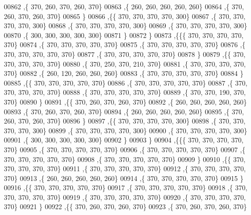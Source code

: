 \begin{DoxyCode}
00862    ,\{   370,   260,   370,   260,   370\}
00863    ,\{   260,   260,   260,   260,   260\}
00864    ,\{   370,   260,   370,   260,   370\}
00865    \}
00866   ,\{\{   370,   370,   370,   370,   300\}
00867    ,\{   370,   370,   370,   370,   300\}
00868    ,\{   370,   370,   370,   370,   300\}
00869    ,\{   370,   370,   370,   370,   300\}
00870    ,\{   300,   300,   300,   300,   300\}
00871    \}
00872   \}
00873  ,\{\{\{   370,   370,   370,   370,   370\}
00874    ,\{   370,   370,   370,   370,   370\}
00875    ,\{   370,   370,   370,   370,   370\}
00876    ,\{   370,   370,   370,   370,   370\}
00877    ,\{   370,   370,   370,   370,   370\}
00878    \}
00879   ,\{\{   370,   370,   370,   370,   370\}
00880    ,\{   370,   250,   370,   210,   370\}
00881    ,\{   370,   370,   370,   370,   370\}
00882    ,\{   260,   120,   260,   260,   260\}
00883    ,\{   370,   370,   370,   370,   370\}
00884    \}
00885   ,\{\{   370,   370,   370,   370,   370\}
00886    ,\{   370,   370,   370,   370,   370\}
00887    ,\{   370,   370,   370,   370,   370\}
00888    ,\{   370,   370,   370,   370,   370\}
00889    ,\{   370,   370,   190,   370,   370\}
00890    \}
00891   ,\{\{   370,   260,   370,   260,   370\}
00892    ,\{   260,   260,   260,   260,   260\}
00893    ,\{   370,   260,   370,   260,   370\}
00894    ,\{   260,   260,   260,   260,   260\}
00895    ,\{   370,   260,   370,   260,   370\}
00896    \}
00897   ,\{\{   370,   370,   370,   370,   300\}
00898    ,\{   370,   370,   370,   370,   300\}
00899    ,\{   370,   370,   370,   370,   300\}
00900    ,\{   370,   370,   370,   370,   300\}
00901    ,\{   300,   300,   300,   300,   300\}
00902    \}
00903   \}
00904  ,\{\{\{   370,   370,   370,   370,   370\}
00905    ,\{   370,   370,   370,   370,   370\}
00906    ,\{   370,   370,   370,   370,   370\}
00907    ,\{   370,   370,   370,   370,   370\}
00908    ,\{   370,   370,   370,   370,   370\}
00909    \}
00910   ,\{\{   370,   370,   370,   370,   370\}
00911    ,\{   370,   370,   370,   370,   370\}
00912    ,\{   370,   370,   370,   370,   370\}
00913    ,\{   260,   260,   260,   260,   260\}
00914    ,\{   370,   370,   370,   370,   370\}
00915    \}
00916   ,\{\{   370,   370,   370,   370,   370\}
00917    ,\{   370,   370,   370,   370,   370\}
00918    ,\{   370,   370,   370,   370,   370\}
00919    ,\{   370,   370,   370,   370,   370\}
00920    ,\{   370,   370,   370,   370,   370\}
00921    \}
00922   ,\{\{   370,   260,   370,   260,   370\}
00923    ,\{   370,   260,   370,   260,   370\}

\end{DoxyCode}
